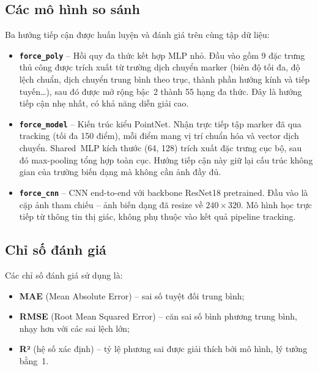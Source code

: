 \subsection{Các mô hình so sánh}

Ba hướng tiếp cận được huấn luyện và đánh giá trên cùng tập dữ liệu:

\begin{itemize}
  \item \textbf{\texttt{force\_poly}} -- Hồi quy đa thức kết hợp MLP nhỏ.
        Đầu vào gồm 9 đặc trưng thủ công được trích xuất từ trường dịch
        chuyển marker (biên độ tối đa, độ lệch chuẩn, dịch chuyển trung bình
        theo trục, thành phần hướng kính và tiếp tuyến\ldots), sau đó được
        mở rộng bậc~2 thành 55 hạng đa thức. Đây là hướng tiếp cận nhẹ nhất,
        có khả năng diễn giải cao.

  \item \textbf{\texttt{force\_model}} -- Kiến trúc kiểu PointNet. Nhận trực
        tiếp tập marker đã qua tracking (tối đa 150 điểm), mỗi điểm mang vị
        trí chuẩn hóa và vector dịch chuyển. Shared~MLP kích thước (64, 128)
        trích xuất đặc trưng cục bộ, sau đó max-pooling tổng hợp toàn cục.
        Hướng tiếp cận này giữ lại cấu trúc không gian của trường biến dạng
        mà không cần ảnh đầy đủ.

  \item \textbf{\texttt{force\_cnn}} -- CNN end-to-end với backbone ResNet18
        pretrained. Đầu vào là cặp ảnh tham chiếu -- ảnh biến dạng đã resize
        về $240\times320$. Mô hình học trực tiếp từ thông tin thị giác, không
        phụ thuộc vào kết quả pipeline tracking.
\end{itemize}

\subsection{Chỉ số đánh giá}

Các chỉ số đánh giá sử dụng là:
\begin{itemize}
  \item \textbf{MAE} (Mean Absolute Error) -- sai số tuyệt đối trung bình;
  \item \textbf{RMSE} (Root Mean Squared Error) -- căn sai số bình phương
        trung bình, nhạy hơn với các sai lệch lớn;
  \item \textbf{R²} (hệ số xác định) -- tỷ lệ phương sai được giải thích bởi
        mô hình, lý tưởng bằng~1.
\end{itemize}

